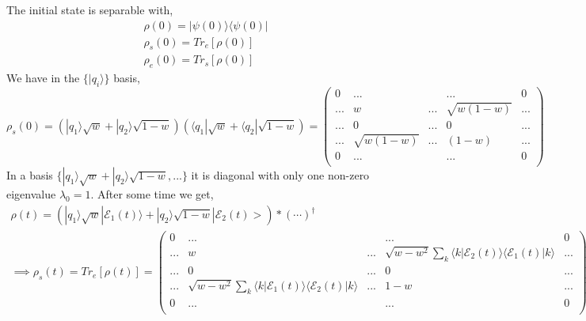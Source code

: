 \documentclass{article}
\begin{document}
The initial state is separable with,
\begin{align*}
    \rho(0)=|\psi(0)\rangle\langle \psi(0)| \\
    \rho_s(0) = Tr_e[\rho(0)] \\
    \rho_e(0)= Tr_s[\rho(0)]
\end{align*}
We have in the $\{|q_i\rangle\}$ basis,
\begin{equation}
    \rho_s(0) = (|q_1\rangle\sqrt{w}+|q_2\rangle\sqrt{1-w})(\langle q_1|\sqrt{w}+\langle q_2|\sqrt{1-w}) = 
    \begin{pmatrix}
        0 & ... & & ... & 0 \\
        ... & w & ... & \sqrt{w(1-w)} & ... \\
        ... & 0 & ... & 0 & ... \\
        ... & \sqrt{w(1-w)} & ... & (1-w) & ... \\
        0 & ... & & ... & 0 \\
    \end{pmatrix}
    \label{eq:rhos0}
\end{equation}
In a basis $\{|q_1\rangle\sqrt{w}+|q_2\rangle\sqrt{1-w},...\}$ it is diagonal with only one non-zero eigenvalue $\lambda_0=1$.
After some time we get,
\begin{align}
    \rho(t) =(|q_1\rangle \sqrt{w}|\mathcal{E}_1(t)\rangle+|q_2\rangle \sqrt{1-w}|\mathcal{E}_2(t)>)*(\cdots)^{\dagger}\\
    \implies\rho_s(t)=Tr_e[\rho(t)]
    =\begin{pmatrix}
        0 & ... & & ... & 0 \\
        ... & w & ... & \sqrt{w-w^2}\sum_k\langle k|\mathcal{E}_2(t)\rangle\langle\mathcal{E}_1(t)|k\rangle & ... \\
        ... & 0 & ... & 0 & ... \\
        ... & \sqrt{w-w^2}\sum_k\langle k|\mathcal{E}_1(t)\rangle\langle\mathcal{E}_2(t)|k\rangle & ... & 1-w & ... \\
        0 & ... & & ... & 0 \\
    \end{pmatrix}\\
    \label{eq:rhost}
\end{align}
\end{document}
